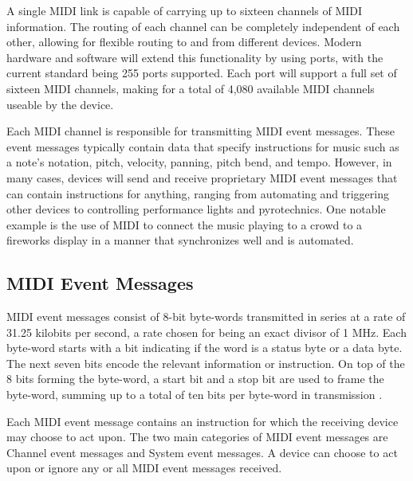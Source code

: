 \documentclass[a4paper,12pt]{report}
\begin{document}
A single MIDI link is capable of carrying up to sixteen channels of MIDI information. The routing of each channel can be completely independent of each other, allowing for flexible routing to and from different devices. Modern hardware and software will extend this functionality by using ports, with the current standard being 255 ports supported. Each port will support a full set of sixteen MIDI channels, making for a total of 4,080 available MIDI channels useable by the device.

Each MIDI channel is responsible for transmitting MIDI event messages. These event messages typically contain data that specify instructions for music such as a note's notation, pitch, velocity, panning, pitch bend, and tempo. However, in many cases, devices will send and receive proprietary MIDI event messages that can contain instructions for anything, ranging from automating and triggering other devices to controlling performance lights and pyrotechnics. One notable example is the use of MIDI to connect the music playing to a crowd to a fireworks display in a manner that synchronizes well and is automated.

\subsection{MIDI Event Messages}
\label{subsec:midieventmsg}

MIDI event messages consist of 8-bit byte-words transmitted in series at a rate of 31.25 kilobits per second, a rate chosen for being an exact divisor of 1 MHz. Each byte-word starts with a bit indicating if the word is a status byte or a data byte. The next seven bits encode the relevant information or instruction. On top of the 8 bits forming the byte-word, a start bit and a stop bit are used to frame the byte-word, summing up to a total of ten bits per byte-word in transmission \cite{midispec}. 

Each MIDI event message contains an instruction for which the receiving device may choose to act upon. The two main categories of MIDI event messages are Channel event messages and System event messages. A device can choose to act upon or ignore any or all MIDI event messages received.
\end{document}
